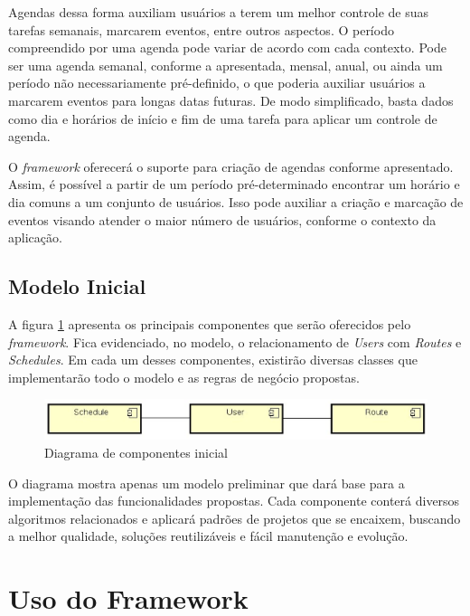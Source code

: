 Agendas dessa forma auxiliam usuários a terem um melhor controle de suas tarefas semanais, marcarem eventos, entre outros aspectos. O período compreendido por uma agenda pode variar de acordo com cada contexto. Pode ser uma agenda semanal, conforme a apresentada, mensal, anual, ou ainda um período não necessariamente pré-definido, o que poderia auxiliar usuários a marcarem eventos para longas datas futuras. De modo simplificado, basta dados como dia e horários de início e fim de uma tarefa para aplicar um controle de agenda.

O \textit{framework} oferecerá o suporte para criação de agendas conforme apresentado. Assim, é possível a partir de um período pré-determinado encontrar um horário e dia comuns a um conjunto de usuários. Isso pode auxiliar a criação e marcação de eventos visando atender o maior número de usuários, conforme o contexto da aplicação.

\subsection{Modelo Inicial}

A figura \ref{diagrama de componentes} apresenta os principais componentes que serão oferecidos pelo \textit{framework}. Fica evidenciado, no modelo, o relacionamento de \textit{Users} com \textit{Routes} e \textit{Schedules}. Em cada um desses componentes, existirão diversas classes que implementarão todo o modelo e as regras de negócio propostas.

\begin{figure}[!h]
	\centering
	\includegraphics[scale=0.55]{figuras/capitulo5/diagrama_componentes.eps}
	\caption{Diagrama de componentes inicial}
	\label{diagrama de componentes}
\end{figure}

O diagrama mostra apenas um modelo preliminar que dará base para a implementação das funcionalidades propostas. Cada componente conterá diversos algoritmos relacionados e aplicará padrões de projetos que se encaixem, buscando a melhor qualidade, soluções reutilizáveis e fácil manutenção e evolução.

\section{Uso do Framework}

